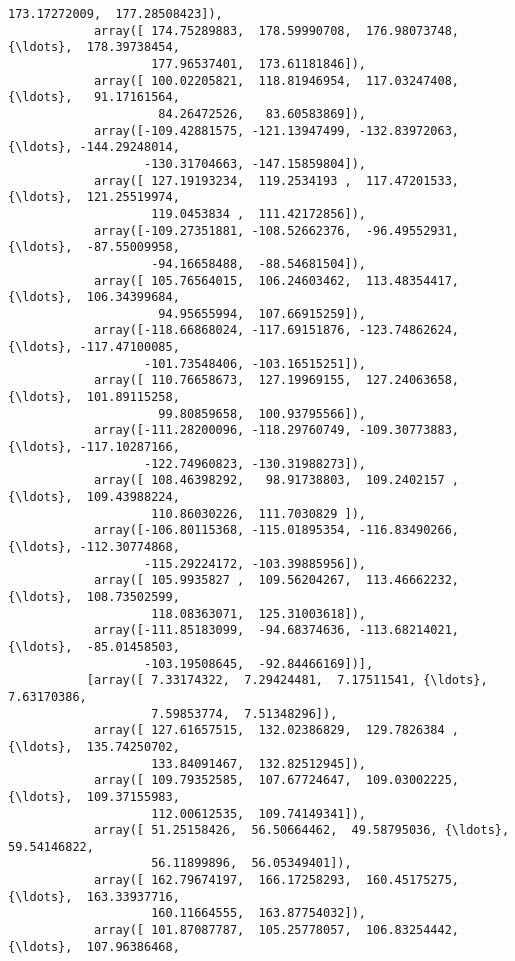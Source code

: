 \documentclass[11pt]{article}
\begin{document}
\begin{Verbatim}[commandchars=\\\{\}]
                    173.17272009,  177.28508423]),
            array([ 174.75289883,  178.59990708,  176.98073748, {\ldots},  178.39738454,
                    177.96537401,  173.61181846]),
            array([ 100.02205821,  118.81946954,  117.03247408, {\ldots},   91.17161564,
                     84.26472526,   83.60583869]),
            array([-109.42881575, -121.13947499, -132.83972063, {\ldots}, -144.29248014,
                   -130.31704663, -147.15859804]),
            array([ 127.19193234,  119.2534193 ,  117.47201533, {\ldots},  121.25519974,
                    119.0453834 ,  111.42172856]),
            array([-109.27351881, -108.52662376,  -96.49552931, {\ldots},  -87.55009958,
                    -94.16658488,  -88.54681504]),
            array([ 105.76564015,  106.24603462,  113.48354417, {\ldots},  106.34399684,
                     94.95655994,  107.66915259]),
            array([-118.66868024, -117.69151876, -123.74862624, {\ldots}, -117.47100085,
                   -101.73548406, -103.16515251]),
            array([ 110.76658673,  127.19969155,  127.24063658, {\ldots},  101.89115258,
                     99.80859658,  100.93795566]),
            array([-111.28200096, -118.29760749, -109.30773883, {\ldots}, -117.10287166,
                   -122.74960823, -130.31988273]),
            array([ 108.46398292,   98.91738803,  109.2402157 , {\ldots},  109.43988224,
                    110.86030226,  111.7030829 ]),
            array([-106.80115368, -115.01895354, -116.83490266, {\ldots}, -112.30774868,
                   -115.29224172, -103.39885956]),
            array([ 105.9935827 ,  109.56204267,  113.46662232, {\ldots},  108.73502599,
                    118.08363071,  125.31003618]),
            array([-111.85183099,  -94.68374636, -113.68214021, {\ldots},  -85.01458503,
                   -103.19508645,  -92.84466169])],
           [array([ 7.33174322,  7.29424481,  7.17511541, {\ldots},  7.63170386,
                    7.59853774,  7.51348296]),
            array([ 127.61657515,  132.02386829,  129.7826384 , {\ldots},  135.74250702,
                    133.84091467,  132.82512945]),
            array([ 109.79352585,  107.67724647,  109.03002225, {\ldots},  109.37155983,
                    112.00612535,  109.74149341]),
            array([ 51.25158426,  56.50664462,  49.58795036, {\ldots},  59.54146822,
                    56.11899896,  56.05349401]),
            array([ 162.79674197,  166.17258293,  160.45175275, {\ldots},  163.33937716,
                    160.11664555,  163.87754032]),
            array([ 101.87087787,  105.25778057,  106.83254442, {\ldots},  107.96386468,

\end{Verbatim}
\end{document}
